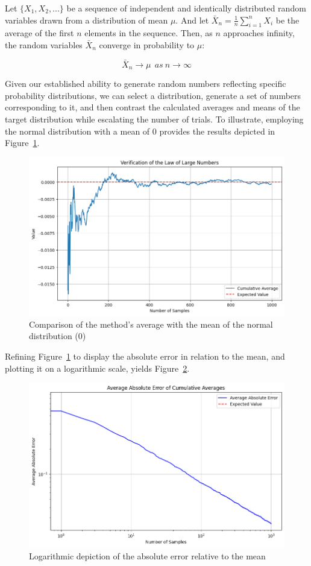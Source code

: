 \documentclass{article}
\begin{document}
\begin{theorem}
 Let \(\{X_1, X_2, ...\}\) be a sequence of independent and identically distributed random variables drawn from a distribution of mean \(\mu\). And let \(\bar{X}_n = \frac{1}{n}\sum_{i=1}^{n} X_i\) be the average of the first \(n\) elements in the sequence. Then, as \(n\) approaches infinity, the random variables \(\bar{X}_n\) converge in probability to \(\mu\):

 \begin{equation}
	 \bar{X}_n \rightarrow \mu \ \ as \ n \rightarrow \infty
\end{equation}

\end{theorem}

Given our established ability to generate random numbers reflecting specific probability distributions, we can select a distribution, generate a set of numbers corresponding to it, and then contrast the calculated averages and means of the target distribution while escalating the number of trials. To illustrate, employing the normal distribution with a mean of 0 provides the results depicted in Figure~\ref{fig:verificationlln}.

\begin{figure}[H]
	\centering
	\includegraphics[width=0.5\linewidth]{./Figures/LLN/verif.png}
	\caption{Comparison of the method's average with the mean of the normal distribution (0)}
	\label{fig:verificationlln}
\end{figure}

Refining Figure~\ref{fig:verificationlln} to display the absolute error in relation to the mean, and plotting it on a logarithmic scale, yields Figure~\ref{fig:verificationllnlog}.

\begin{figure}[H]
	\centering
	\includegraphics[width=0.5\linewidth]{./Figures/LLN/verifloglog.png}
	\caption{Logarithmic depiction of the absolute error relative to the mean}
	\label{fig:verificationllnlog}
\end{figure}
\end{document}
